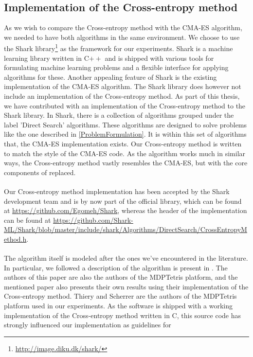 \subsection{Implementation of the Cross-entropy method}

As we wish to compare the Cross-entropy method 
with the CMA-ES algorithm, we needed to have both algorithms
in the same environment. We choose to use the Shark 
library\footnote{\url{http://image.diku.dk/shark/}}
as the framework for our experiments. Shark is a machine 
learning library written in C$++$ and is shipped with various tools
for formulating machine learning problems and a flexible 
interface for applying algorithms for these. Another appealing
feature of Shark is the existing implementation of the CMA-ES algorithm.
The Shark library does however not include an implementation of
the Cross-entropy method. As part of this thesis, we have contributed with
an implementation of the Cross-entropy method to the Shark library.
In Shark, there is a collection of algorithms grouped under the label
'Direct Search' algorithms. These algorithms are designed to solve 
problems like the one described in \ref{ProblemFormulation}. It is within this set of algorithms that, 
the CMA-ES implementation exists. Our Cross-entropy method 
is written to match the style of the CMA-ES code. As the algorithm
works much in similar ways, the Cross-entropy method vastly resembles the CMA-ES, 
but with the core components of replaced.\\
\\
Our Cross-entropy method implementation has been accepted by the Shark development team and is 
by now part of the official library, which can be found at 
\url{https://github.com/Egomeh/Shark}, whereas the header of the 
implementation can be found at 
\url{https://github.com/Shark-ML/Shark/blob/master/include/shark/Algorithms/DirectSearch/CrossEntropyMethod.h}.\\
\\
The algorithm itself is modeled after the ones we've encountered 
in the literature. In particular, we followed a description of the algorithm is 
present in \citep{scherrer2009}. The authors of this paper are also the authors of the MDPTetris
platform, and the mentioned paper also presents their own results using their implementation of
the Cross-entropy method. 
Thiery and Scherrer are the authors of the 
MDPTetris platform used in our experiments.  As the 
software is shipped with a working implementation of the Cross-entropy method written in C,
this source code has strongly influenced our implementation as guidelines for
